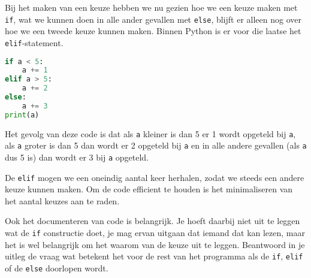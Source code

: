Bij het maken van een keuze hebben we nu gezien hoe we een keuze maken met \texttt{if}, wat we kunnen doen in alle ander gevallen met \texttt{else}, blijft er alleen nog over hoe we een tweede keuze kunnen maken. Binnen Python is er voor die laatse het \texttt{elif}-statement.
\begin{lstlisting}[language=python]
if a < 5:
    a += 1
elif a > 5:
    a += 2
else:
    a += 3
print(a)
\end{lstlisting}
Het gevolg van deze code is dat als \texttt{a} kleiner is dan 5 er 1 wordt opgeteld bij \texttt{a}, als \texttt{a} groter is dan 5 dan wordt er 2 opgeteld bij \texttt{a} en in alle andere gevallen (als \texttt{a} dus 5 is) dan wordt er 3 bij \texttt{a} opgeteld.

De \texttt{elif} mogen we een oneindig aantal keer herhalen, zodat we steeds een andere keuze kunnen maken. Om de code efficient te houden is het minimaliseren van het aantal keuzes aan te raden.

Ook het documenteren van code is belangrijk. Je hoeft daarbij niet uit te leggen wat de \texttt{if} constructie doet, je mag ervan uitgaan dat iemand dat kan lezen, maar het is wel belangrijk om het waarom van de keuze uit te leggen. Beantwoord in je uitleg de vraag wat betekent het voor de rest van het programma als de \texttt{if}, \texttt{elif} of de \texttt{else} doorlopen wordt.

